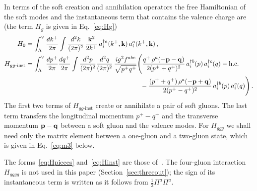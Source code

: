 In terms of the soft creation and annihilation operators the free Hamiltonian of the soft modes and the instantaneous term that contains the valence charge are (the term $H_g$ is given in Eq.~\eqref{eq:Hg})
\begin{align}
H_0&=\int_\Lambda^\vee\frac{dk^+}{2\pi}\int\frac{d^2k}{(2\pi)^2}\,\frac{\v k^2}{2k^+}\,a^{\dagger a}_i(k^+,\v k)\,a^a_i(k^+,\v k)\,,\label{eq:H0soft}\\
H_{gg\text{-inst}}&=\int_\Lambda^\vee\frac{dp^+}{2\pi}\frac{dq^+}{2\pi}\int\frac{d^2p}{(2\pi)^2}\frac{d^2q}{(2\pi)^2}\,\frac{ig^2f^{abc}}{\sqrt{p^+q^+}}
\Bigg(\frac{q^+\,\rho^a(-\v p-\v q)}{2(p^++q^+)^2}\,a^{\dagger b}_i(p)\,a^{\dagger c}_i(q)-{\rm h.c.}\notag\\
&\hspace{6.2cm}-\frac{(p^++q^+)\,\rho^a(-\v p+\v q)}{2(p^+-q^+)^2}\,a^{\dagger b}_i(p)\,a^c_i(q)\Bigg)\,.\label{eq:Hinst}
\end{align}
The first two terms of $H_{gg\text{-inst}}$ create or annihilate a pair of soft gluons. The last term transfers the longitudinal momentum $p^+-q^+$ and the transverse momentum $\mathbf{p}-\mathbf{q}$ between a soft gluon and the valence modes. For $H_{ggg}$ we shall need only the matrix element between a one-gluon and a two-gluon state, which is given in Eq.~\eqref{eq:m3} below.

The forms~\eqref{eq:Hpieces} and~\eqref{eq:Hinst} are those of~\cite{Lublinsky:2016meo}. The four-gluon interaction $H_{gggg}$ is not used in this paper (Section~\ref{sec:threeout}); the sign of its instantaneous term is written as it follows from $\frac12\Pi^a\Pi^a$.

